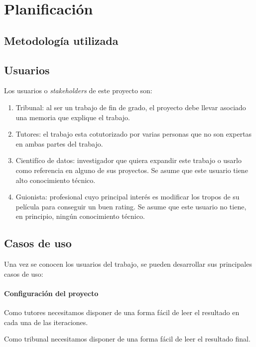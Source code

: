 \chapter{Planificación}

\section{Metodología utilizada}


\section{Usuarios}

Los usuarios o \textit{stakeholders} de este proyecto son:

\begin{enumerate}
      \item Tribunal: al ser un trabajo de fin de grado, el proyecto debe llevar asociado una memoria
            que explique el trabajo.
      \item Tutores: el trabajo esta cotutorizado por varias personas que no son expertas en ambas partes del trabajo.
      \item Cientifíco de datos: investigador que quiera expandir este trabajo o usarlo como
            referencia en alguno de sus proyectos. Se asume que este usuario tiene alto conocimiento técnico.
      \item Guionista: profesional cuyo principal interés es modificar los tropos de su película para
            conseguir un buen rating. Se asume que este usuario no tiene, en principio, ningún conocimiento
            técnico.
\end{enumerate}

\section{Casos de uso}

Una vez se conocen los usuarios del trabajo, se pueden desarrollar sus principales casos de uso:

\subsubsection*{Configuración del proyecto} \label{uc:configuration}

Como tutores necesitamos disponer de una forma fácil de leer el resultado en cada
una de las iteraciones.

Como tribunal necesitamos disponer de una forma fácil de leer el resultado final.

